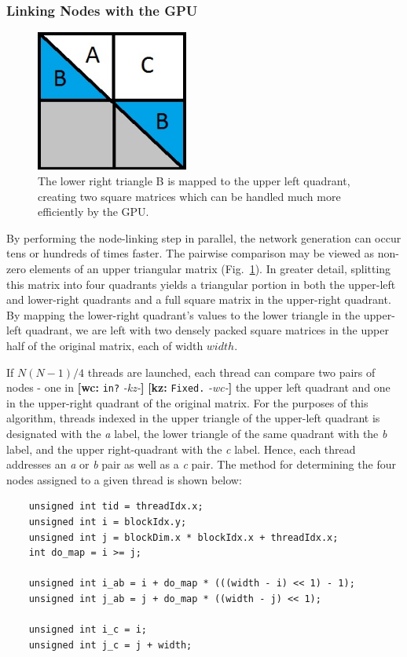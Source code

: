 \documentclass[preprint,notitlepage,amsmath,amssymb,floatfix]{revtex4-1}
\newcommand{\XXX}[3]{{\bf [#1: } {\tt #3} {\it -#2-}{\bf ]}}
\begin{document}
\subsubsection{Linking Nodes with the GPU}

\begin{figure}
\includegraphics[width=5cm]{figures/Matrix_Map.jpg}
\caption{The lower right triangle B is mapped to the upper left quadrant, creating two square matrices which can be handled much more efficiently by the GPU.}
\label{fig:matrix_map}
\centering
\end{figure}

By performing the node-linking step in parallel, the network generation can occur tens or hundreds of times faster.
The pairwise comparison may be viewed as non-zero elements of an upper triangular matrix (Fig.~\ref{fig:matrix_map}).
In greater detail, splitting this matrix into four quadrants yields a triangular portion in both the upper-left and lower-right quadrants and a full square matrix in the upper-right quadrant.
By mapping the lower-right quadrant's values to the lower triangle in the upper-left quadrant, we are left with two densely packed square matrices in the upper half of the original matrix, each of width $width$. \par
If $N(N-1)/4$ threads are launched, each thread can compare two pairs of nodes - one in \XXX{wc}{kz}{in?} \XXX{kz}{wc}{Fixed.} the upper left quadrant and one in the upper-right quadrant of the original matrix.
For the purposes of this algorithm, threads indexed in the upper triangle of the upper-left quadrant is designated with the \textit{a} label, the lower triangle of the same quadrant with the \textit{b} label, and the upper right-quadrant with the \textit{c} label.  
Hence, each thread addresses an \textit{a} or \textit{b} pair as well as a \textit{c} pair.  
The method for determining the four nodes assigned to a given thread is shown below:

\begin{lstlisting}
	unsigned int tid = threadIdx.x;
	unsigned int i = blockIdx.y;
	unsigned int j = blockDim.x * blockIdx.x + threadIdx.x;
	int do_map = i >= j;

	unsigned int i_ab = i + do_map * (((width - i) << 1) - 1);
	unsigned int j_ab = j + do_map * ((width - j) << 1);

	unsigned int i_c = i;
	unsigned int j_c = j + width;
\end{lstlisting}
\end{document}
